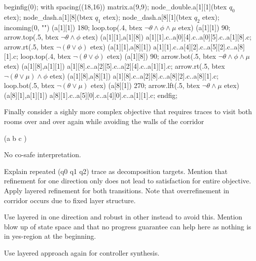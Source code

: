     beginfig(0);
        with spacing((18,16)) matrix.a(9,9);
        node_double.a[1][1](btex $q_0$ etex);
        node_dash.a[1][8](btex $q_1$ etex);
        node_dash.a[8][1](btex $q_2$ etex);
        incoming(0, "") (a[1][1]) 180;
        loop.top(.4, btex \small \;$ \neg \theta \wedge \phi \wedge \mu$ etex) (a[1][1]) 90;
        arrow.top(.5, btex \small $ \neg \theta \wedge \phi $ etex) (a[1][1],a[1][8]) a[1][1].c..a[0][4].c..a[0][5].c..a[1][8].c;
        arrow.rt(.5, btex \small $ \neg (\theta \vee \phi)$ etex) (a[1][1],a[8][1]) a[1][1].c..a[4][2].c..a[5][2].c..a[8][1].c;
        loop.top(.4, btex \small \;$ \neg (\theta \vee \phi) $ etex) (a[1][8]) 90;
        arrow.bot(.5, btex \small $ \neg \theta \wedge \phi \wedge \mu $ etex) (a[1][8],a[1][1]) a[1][8].c..a[2][5].c..a[2][4].c..a[1][1].c;
        arrow.rt(.5, btex \small \;$ \neg (\theta \vee \mu) \wedge \phi $ etex) (a[1][8],a[8][1]) a[1][8].c..a[2][8].c..a[8][2].c..a[8][1].c;
        loop.bot(.5, btex \small \;$ \neg (\theta \vee \mu) $ etex) (a[8][1]) 270;
        arrow.lft(.5, btex \small $ \neg \theta \wedge \mu $ etex) (a[8][1],a[1][1]) a[8][1].c..a[5][0].c..a[4][0].c..a[1][1].c;
    endfig;
\stopreusableMPgraphic

\startsubsection[title={2-Recurrence and Safety}]


    Finally consider a sighly more complex objective that requires traces to visit both rooms over and over again while avoiding the walls of the corridor

    \startformula
        \Globally (\neg a \wedge \Finally b \wedge \Finally c )
    \stopformula

    No co-safe interpretation.

    Explain repeated (q0 q1 q2) trace as decomposition targets.
    Mention that refinement for one direction only does not lead to satisfaction for entire objective.
    Apply layered refinement for both transitions.
    Note that overrefinement in corridor occurs due to fixed layer structure.

    Use layered in one direction and robust in other instead to avoid this.
    Mention blow up of state space and that no progress guarantee can help here as nothing is in yes-region at the beginning.

    Use layered approach again for controller synthesis.

\stopsubsection

